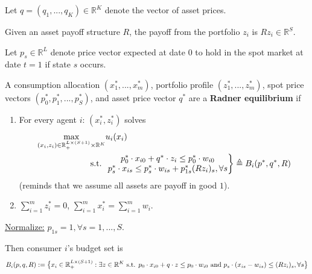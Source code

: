 \documentclass[11pt]{elegantbook}
\begin{document}
Let $q=(q_1,...,q_K)\in \mathbb{R}^K$ denote the vector of asset prices.

Given an asset payoff structure $R$, the payoff from the portfolio $z_i$ is $Rz_i\in \mathbb{R}^S$.

Let $p_s\in \mathbb{R}^L$ denote price vector expected at date $0$ to hold in the spot market at date $t=1$ if state $s$ occurs.

\begin{definition}
    \normalfont
    A consumption allocation $(x_1^*,...,x_m^*)$, portfolio profile $(z_1^*,...,z_m^*)$, spot price vectors $(p_0^*,p_1^*,...,p_S^*)$, and asset price vector $q^*$ are a \textbf{Radner equilibrium} if
    \begin{enumerate}
        \item For every agent $i$: $(x_i^*,z_i^*)$ solves
        \begin{equation}
            \begin{aligned}
                \max_{(x_i,z_i)\in \mathbb{R}^{L\times (S+1)}_+\times \mathbb{R}^K} &u_i(x_i)\\
                \textnormal{s.t. } &
                \left.\begin{matrix}
                p_0^*\cdot x_{i0}+q^*\cdot z_i\leq p_0^*\cdot w_{i0}\\
                p_s^*\cdot x_{is}\leq p_s^*\cdot w_{is}+p_{1s}^*(Rz_i)_s, \forall s
                \end{matrix}\right\}\triangleq B_i(p^*,q^*,R)
            \end{aligned}
            \nonumber
        \end{equation}
        (reminds that we assume all assets are payoff in good $1$).
        \item $\sum_{i=1}^mz_i^*=0$, $\sum_{i=1}^m x_i^*=\sum_{i=1}^m w_i$.
    \end{enumerate}
\end{definition}

\begin{note}
    \underline{Normalize:} $p_{1s}=1, \forall s=1,...,S$.
\end{note}
Then consumer $i$'s budget set is
\begin{equation}
    \begin{aligned}
        B_i(p,q,R):=\big\{x_i\in \mathbb{R}^{L\times (S+1)}_+:\exists z\in \mathbb{R}^K\textnormal{ s.t. }p_0\cdot x_{i0}+q\cdot z\leq p_0\cdot w_{i0}
        \textnormal{ and }p_s\cdot(x_{is}-w_{is})\leq (Rz_i)_s, \forall s\big\}
    \end{aligned}
    \nonumber
\end{equation}
\end{document}
